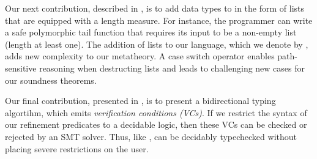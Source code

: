 %
Our next contribution,
described in ,
is to add data types to \sysrf in the form of
lists that are equipped with a length measure.
%
For instance, the programmer can write a safe polymorphic 
tail function that requires its input to be a non-empty
list (length at least one).
%
The addition of lists to our language, which we denote
by \sysrfd,
adds new complexity to our metatheory.
%
A case switch operator enables path-sensitive reasoning when
destructing lists and leads to challenging new cases for our
soundness theorems.

%
Our final contribution,
presented in ,
is to present a bidirectional typing algortihm, which emits
\emph{verification conditions (VCs)}. If we restrict the syntax
of our refinement predicates to a decidable logic, then these VCs 
can be checked or rejected by an SMT solver. Thus, like \lh,
\sysrfd can be decidably typechecked without placing severe 
restrictions on the user. 
